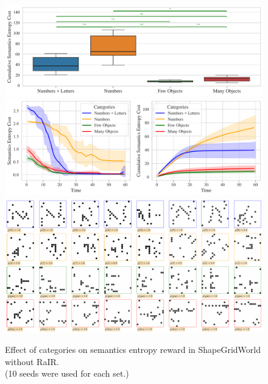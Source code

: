 \begin{figure}[H]
    \centering
    \includegraphics[width=\textwidth]{images/categories_boxplot_sgw_norair_cropped.pdf}\vspace{6pt}
    \includegraphics[width=\textwidth]{images/categories_comparison_sgw_norair_cropped.pdf}\vspace{6pt}
    \includegraphics[width=\textwidth]{images/categories_samples_sgw_norair_cropped.pdf}\vspace{3pt}
    \captionsetup{justification=centering}
    \caption[Effect of categories on semantics entropy reward in ShapeGridWorld without RaIR.]{Effect of categories on semantics entropy reward in ShapeGridWorld without RaIR.\\(10 seeds were used for each set.)}
    \label{fig:categories-sgw-norair}
\end{figure}

